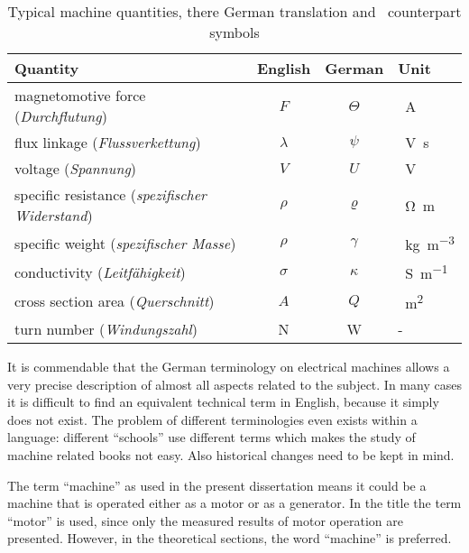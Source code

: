 \begin{table}[htbp]
  \caption[Typical machine quantities and their German translation]%
  {Typical machine quantities, there German translation and~%
  counterpart symbols}
  \label{tab:translation}
  \centering
  \begin{tabular}{lccl}
  \toprule
  Quantity   &  English  & German & Unit \\
  \toprule
  magnetomotive force (\textit{Durchflutung}) & 
  $F$& $\Theta$ & \SI{}{A}\\
  \midrule
  flux linkage (\textit{Flussverkettung}) & 
  $\lambda$& $\psi$ & \SI{}{V.s}   \\
  \midrule
  voltage (\textit{Spannung})  & 
  $V$& $U$ & \SI{}{V} \\
  \midrule
  specific resistance (\textit{spezifischer Widerstand})&
  $\rho$& $\varrho$ & \SI{}{\ohm.m} \\
  \midrule
  specific weight (\textit{spezifischer Masse})&
  $\rho$& $\gamma$& \SI{}{kg.m^{-3}}\\
  \midrule
  conductivity (\textit{Leitfähigkeit})&
  $\sigma$&$\kappa$& \SI{}{S.m^{-1}}\\
  \midrule
  cross section area (\textit{Querschnitt})&
  $A$&$Q$& \SI{}{m^{2}}\\
  \midrule
  turn number (\textit{Windungszahl}) & 
  N& W & - \\
  \bottomrule
  \end{tabular}
\end{table}

It is commendable that the German terminology on electrical machines allows a very precise description of almost all aspects related to the subject. In many cases it is difficult to find an equivalent technical term in English, because it simply does not exist. The problem of different terminologies even exists within a language: different ``schools'' use different terms which makes the study of machine related books not easy. Also historical changes need to be kept in mind.

The term ``machine'' as used in the present dissertation means it could be a machine that is operated either as a motor or as a generator. In the title the term ``motor'' is used, since only the measured results of motor operation are presented. However, in the theoretical sections, the word ``machine'' is preferred.  


